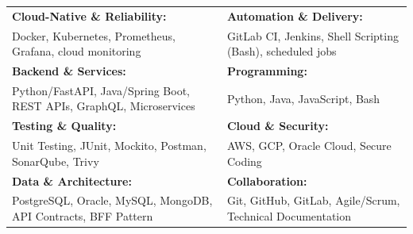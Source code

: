 \renewcommand{\arraystretch}{1.2}

\begin{tabular}{p{} p{}}
    \textbf{Cloud-Native \& Reliability:} & \textbf{Automation \& Delivery:} \\
    Docker, Kubernetes, Prometheus, Grafana, cloud monitoring & GitLab CI, Jenkins, Shell Scripting (Bash), scheduled jobs \\

    \textbf{Backend \& Services:} & \textbf{Programming:} \\
    Python/FastAPI, Java/Spring Boot, REST APIs, GraphQL, Microservices & Python, Java, JavaScript, Bash \\

    \textbf{Testing \& Quality:} & \textbf{Cloud \& Security:} \\
    Unit Testing, JUnit, Mockito, Postman, SonarQube, Trivy & AWS, GCP, Oracle Cloud, Secure Coding \\

    \textbf{Data \& Architecture:} & \textbf{Collaboration:} \\
    PostgreSQL, Oracle, MySQL, MongoDB, API Contracts, BFF Pattern & Git, GitHub, GitLab, Agile/Scrum, Technical Documentation \\
\end{tabular}
